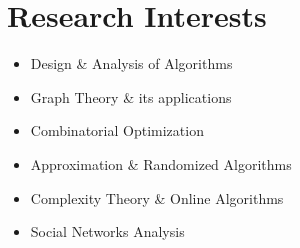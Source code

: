 \documentclass[10pt,a4paper,sans]{moderncv}        %
\begin{document}
	\makecvtitle
	\vspace*{-18mm}

	\section{Research Interests}
	\vspace*{-5mm}
	\begin{multicols}{2}
	\begin{itemize}
		\item Design \& Analysis of Algorithms
		\item Graph Theory \& its applications
		\item Combinatorial Optimization
		\item Approximation \& Randomized Algorithms
		\item Complexity Theory \& Online Algorithms
		\item Social Networks Analysis
	\end{itemize}
\end{multicols}
\end{document}
